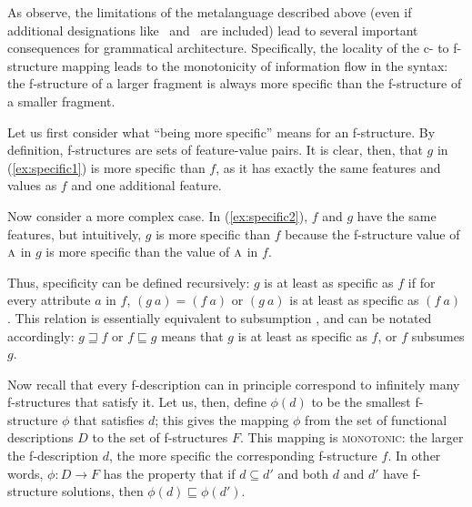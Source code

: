 \documentclass[output=paper,hidelinks]{langscibook}
\begin{document}
 As \textcite[73ff.]{BresnanEtAl2016} observe, the limitations of the metalanguage described above (even if additional designations like \LSTAR\ and \RSTAR\ are included) lead to several important consequences for grammatical architecture. Specifically, the locality of the c- to f-structure mapping leads to the monotonicity of information flow in the syntax: the f-structure of a larger fragment is always more specific than the f-structure of a smaller fragment.
 
 Let us first consider what ``being more specific'' means for an f-structure. By definition, f-structures are sets of feature-value pairs. It is clear, then, that $g$ in (\ref{ex:specific1}) is more specific than $f$, as it has exactly the same features and values as $f$ and one additional feature.
 
 \begin{exe}
 \ex \label{ex:specific1}
 \end{exe}
 
 Now consider a more complex case. In (\ref{ex:specific2}), $f$ and $g$ have the same features, but intuitively, $g$ is more specific than $f$ because the f-structure value of $\textsc{a}$ in $g$ is more specific than the value of $\textsc{a}$ in $f$.
 
 \begin{exe}
 \ex \label{ex:specific2}
 \end{exe}
 
 Thus, specificity can be defined recursively: $g$ is at least as specific as $f$ if for every attribute $a$ in $f$, $(g \: a) = (f \: a)$ or $(g \: a)$ is at least as specific as $(f~a)$ \parencite[74]{BresnanEtAl2016}. This relation is essentially equivalent to subsumption \parencite[240]{DLM:LFG}, and can be notated accordingly: $g \sqsupseteq f$ or $f \sqsubseteq g$ means that $g$ is at least as specific as $f$, or $f$ subsumes $g$.
 
 Now recall that every f-description can in principle correspond to infinitely many f-structures that satisfy it. Let us, then, define $\phi(d)$ to be the smallest f-structure $\phi$ that satisfies $d$; this gives the mapping $\phi$ from the set of functional descriptions $D$ to the set of f-structures $F$. This mapping is \textsc{monotonic}: the larger the f-description $d$, the more specific the corresponding f-structure $f$. In other words, $\phi : D \rightarrow F$ has the property that if $d \subseteq d'$ and both $d$ and $d'$ have f-structure solutions, then $\phi(d) \sqsubseteq \phi(d')$.
\end{document}
